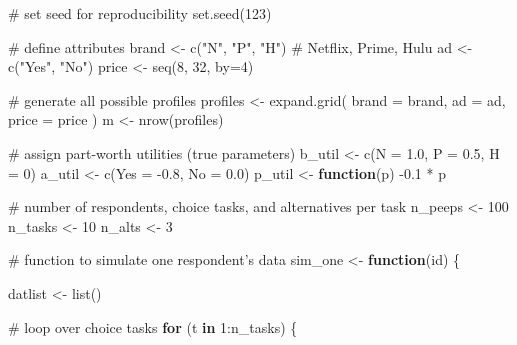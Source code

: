 \documentclass[
  letterpaper,
  DIV=11,
  numbers=noendperiod]{scrartcl}
\newenvironment{Shaded}{\begin{snugshade}}{\end{snugshade}}
\newcommand{\AttributeTok}[1]{\textcolor[rgb]{0.40,0.45,0.13}{#1}}
\newcommand{\CommentTok}[1]{\textcolor[rgb]{0.37,0.37,0.37}{#1}}
\newcommand{\ControlFlowTok}[1]{\textcolor[rgb]{0.00,0.23,0.31}{\textbf{#1}}}
\newcommand{\DecValTok}[1]{\textcolor[rgb]{0.68,0.00,0.00}{#1}}
\newcommand{\FloatTok}[1]{\textcolor[rgb]{0.68,0.00,0.00}{#1}}
\newcommand{\FunctionTok}[1]{\textcolor[rgb]{0.28,0.35,0.67}{#1}}
\newcommand{\NormalTok}[1]{\textcolor[rgb]{0.00,0.23,0.31}{#1}}
\newcommand{\OtherTok}[1]{\textcolor[rgb]{0.00,0.23,0.31}{#1}}
\newcommand{\SpecialCharTok}[1]{\textcolor[rgb]{0.37,0.37,0.37}{#1}}
\newcommand{\StringTok}[1]{\textcolor[rgb]{0.13,0.47,0.30}{#1}}
\begin{document}
\begin{Shaded}
\begin{Highlighting}[]
\CommentTok{\# set seed for reproducibility}
\FunctionTok{set.seed}\NormalTok{(}\DecValTok{123}\NormalTok{)}

\CommentTok{\# define attributes}
\NormalTok{brand }\OtherTok{\textless{}{-}} \FunctionTok{c}\NormalTok{(}\StringTok{"N"}\NormalTok{, }\StringTok{"P"}\NormalTok{, }\StringTok{"H"}\NormalTok{) }\CommentTok{\# Netflix, Prime, Hulu}
\NormalTok{ad }\OtherTok{\textless{}{-}} \FunctionTok{c}\NormalTok{(}\StringTok{"Yes"}\NormalTok{, }\StringTok{"No"}\NormalTok{)}
\NormalTok{price }\OtherTok{\textless{}{-}} \FunctionTok{seq}\NormalTok{(}\DecValTok{8}\NormalTok{, }\DecValTok{32}\NormalTok{, }\AttributeTok{by=}\DecValTok{4}\NormalTok{)}

\CommentTok{\# generate all possible profiles}
\NormalTok{profiles }\OtherTok{\textless{}{-}} \FunctionTok{expand.grid}\NormalTok{(}
    \AttributeTok{brand =}\NormalTok{ brand,}
    \AttributeTok{ad =}\NormalTok{ ad,}
    \AttributeTok{price =}\NormalTok{ price}
\NormalTok{)}
\NormalTok{m }\OtherTok{\textless{}{-}} \FunctionTok{nrow}\NormalTok{(profiles)}

\CommentTok{\# assign part{-}worth utilities (true parameters)}
\NormalTok{b\_util }\OtherTok{\textless{}{-}} \FunctionTok{c}\NormalTok{(}\AttributeTok{N =} \FloatTok{1.0}\NormalTok{, }\AttributeTok{P =} \FloatTok{0.5}\NormalTok{, }\AttributeTok{H =} \DecValTok{0}\NormalTok{)}
\NormalTok{a\_util }\OtherTok{\textless{}{-}} \FunctionTok{c}\NormalTok{(}\AttributeTok{Yes =} \SpecialCharTok{{-}}\FloatTok{0.8}\NormalTok{, }\AttributeTok{No =} \FloatTok{0.0}\NormalTok{)}
\NormalTok{p\_util }\OtherTok{\textless{}{-}} \ControlFlowTok{function}\NormalTok{(p) }\SpecialCharTok{{-}}\FloatTok{0.1} \SpecialCharTok{*}\NormalTok{ p}

\CommentTok{\# number of respondents, choice tasks, and alternatives per task}
\NormalTok{n\_peeps }\OtherTok{\textless{}{-}} \DecValTok{100}
\NormalTok{n\_tasks }\OtherTok{\textless{}{-}} \DecValTok{10}
\NormalTok{n\_alts }\OtherTok{\textless{}{-}} \DecValTok{3}

\CommentTok{\# function to simulate one respondent’s data}
\NormalTok{sim\_one }\OtherTok{\textless{}{-}} \ControlFlowTok{function}\NormalTok{(id) \{}
  
\NormalTok{    datlist }\OtherTok{\textless{}{-}} \FunctionTok{list}\NormalTok{()}
    
    \CommentTok{\# loop over choice tasks}
    \ControlFlowTok{for}\NormalTok{ (t }\ControlFlowTok{in} \DecValTok{1}\SpecialCharTok{:}\NormalTok{n\_tasks) \{}
        

\end{Highlighting}
\end{Shaded}
\end{document}
